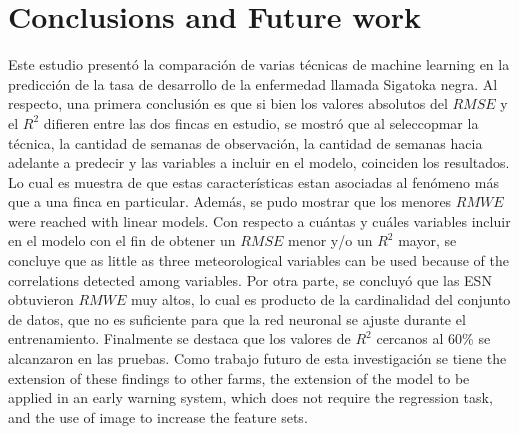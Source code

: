 \section{Conclusions and Future work}
Este estudio presentó la comparación de varias técnicas de machine learning en la predicción de la tasa de desarrollo de la enfermedad llamada Sigatoka negra.  Al respecto, una primera conclusión es que si bien los valores absolutos del $RMSE$ y el $R^2$ difieren entre las dos fincas en estudio, se mostró que al seleccopmar la técnica, la cantidad de semanas de observación, la cantidad de semanas hacia adelante a predecir y las variables a incluir en el modelo, coinciden los resultados. Lo cual es muestra de que estas características estan asociadas al fenómeno más que a una finca en particular. 
%
Además, se pudo mostrar que los menores $RMWE$ were reached with linear models.  
%
Con respecto a cuántas y cuáles variables incluir en el modelo con el fin de obtener un $RMSE$ menor y/o un $R^2$ mayor, se concluye que as little as three meteorological variables can be used because of the correlations detected among variables. 
%
Por otra parte, se concluyó que las ESN obtuvieron $RMWE$ muy altos, lo cual es producto de la cardinalidad del conjunto de datos, que no es suficiente para que la red neuronal se ajuste durante el entrenamiento.
%
Finalmente se destaca que los valores de $R^2$ cercanos al 60\% se alcanzaron en las pruebas.
%
Como trabajo futuro de esta investigación se tiene the extension of these findings to other farms, the extension of the model to be applied in an early warning system, which does not require the regression task, and the use of image to increase the feature sets.


